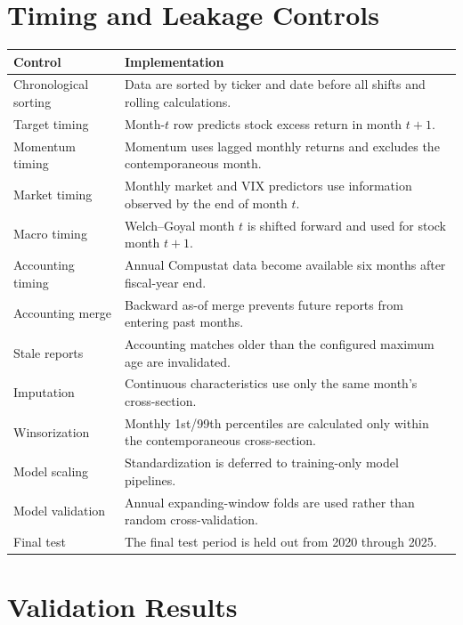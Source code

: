 \documentclass[11pt,a4paper]{article}
\begin{document}
\section{Timing and Leakage Controls}

\begin{center}
\begin{tabularx}{\textwidth}{p{4.1cm}Y}
\toprule
Control & Implementation \\
\midrule
Chronological sorting & Data are sorted by ticker and date before all shifts and rolling calculations. \\
Target timing & Month-$t$ row predicts stock excess return in month $t+1$. \\
Momentum timing & Momentum uses lagged monthly returns and excludes the contemporaneous month. \\
Market timing & Monthly market and VIX predictors use information observed by the end of month $t$. \\
Macro timing & Welch--Goyal month $t$ is shifted forward and used for stock month $t+1$. \\
Accounting timing & Annual Compustat data become available six months after fiscal-year end. \\
Accounting merge & Backward as-of merge prevents future reports from entering past months. \\
Stale reports & Accounting matches older than the configured maximum age are invalidated. \\
Imputation & Continuous characteristics use only the same month's cross-section. \\
Winsorization & Monthly 1st/99th percentiles are calculated only within the contemporaneous cross-section. \\
Model scaling & Standardization is deferred to training-only model pipelines. \\
Model validation & Annual expanding-window folds are used rather than random cross-validation. \\
Final test & The final test period is held out from 2020 through 2025. \\
\bottomrule
\end{tabularx}
\end{center}

\section{Validation Results}
\end{document}
